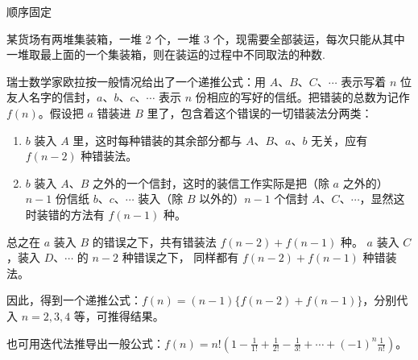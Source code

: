 顺序固定
\begin{exercise}
    某货场有两堆集装箱，一堆 2 个，一堆 3 个，现需要全部装运，每次只能从其中一堆取最上面的一个集装箱，则在装运的过程中不同取法的种数.
\end{exercise}



瑞士数学家欧拉按一般情况给出了一个递推公式：用 $A$、$B$、$C$、$\cdots$ 表示写着 $n$ 位友人名字的信封，$a$、$b$、$c$、$\cdots$ 表示 $n$ 份相应的写好的信纸。把错装的总数为记作 $f(n)$。假设把 $a$ 错装进 $B$ 里了，包含着这个错误的一切错装法分两类：
\begin{enumerate}
    \item $b$ 装入 $A$ 里，这时每种错装的其余部分都与 $A$、$B$、$a$、$b$ 无关，应有 $f(n-2)$ 种错装法。
    \item $b$ 装入 $A$、$B$ 之外的一个信封，这时的装信工作实际是把（除 $a$ 之外的）$n-1$ 份信纸 $b$、$c$、$\cdots$ 装入（除 $B$ 以外的）$n-1$ 个信封 $A$、$C$、$\cdots$，显然这时装错的方法有 $f(n-1)$ 种。
\end{enumerate}
总之在 $a$ 装入 $B$ 的错误之下，共有错装法 $f(n-2) + f(n-1)$ 种。
$a$ 装入 $C$，装入 $D$、$\cdots$ 的 $n-2$ 种错误之下，
同样都有 $f(n-2) + f(n-1)$ 种错装法。

因此，得到一个递推公式：$f(n) = (n-1)\{f(n-2) + f(n-1)\}$，分别代入 $n = 2, 3, 4$ 等，可推得结果。

也可用迭代法推导出一般公式：$f(n) = n!\left(1 - \frac{1}{1!} + \frac{1}{2!} - \frac{1}{3!} + \cdots + (-1)^n \frac{1}{n!}\right)$。











\clearpage

\review

